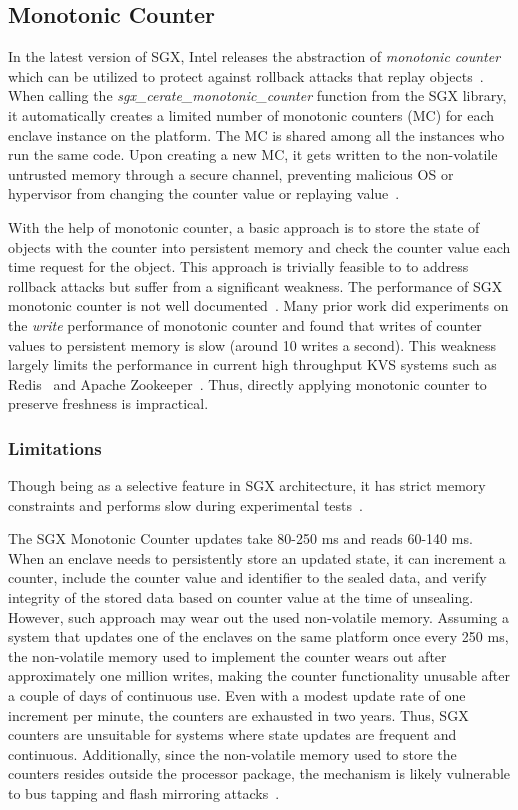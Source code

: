 

\subsection{Monotonic Counter}

In the latest version of SGX, Intel releases the abstraction of \textit{monotonic counter} which can be utilized to 
protect against rollback attacks that replay objects~\cite{}. When calling the 
\textit{sgx\_cerate\_monotonic\_counter} function from the SGX library, it automatically creates a 
limited number of monotonic counters (MC) for each enclave instance on the platform. The MC is shared 
among all the instances who run the same code. Upon creating a new MC, it gets written to the non-volatile
untrusted memory through a secure channel, preventing malicious OS or hypervisor from changing the counter 
value or replaying value~\cite{}.

With the help of monotonic counter, a basic approach is to store
the state of objects with the counter into persistent memory and check the counter value 
each time request for the object. This approach is trivially feasible to to address 
rollback attacks but suffer from a significant weakness. The performance of SGX monotonic 
counter is not well documented~\cite{}. Many prior work did experiments on the \textit{write}
performance of monotonic counter and found that writes of counter values to persistent
memory is slow (around 10 writes a second). This weakness largely limits the performance in 
current high throughput KVS systems such as Redis~\cite{} and Apache Zookeeper~\cite{}.
Thus, directly applying monotonic counter to preserve freshness is impractical.



\subsubsection{Limitations}
Though being as a selective feature in SGX architecture, it has strict memory constraints and performs slow during experimental tests~\cite{}. 

The SGX Monotonic Counter updates take 80-250 ms and reads 60-140 ms. When an enclave needs to persistently store an updated state, it can increment a counter, include the counter value and identifier to the sealed data, and verify integrity of the stored data based on counter value at the time of unsealing. However, such approach may wear out the used non-volatile memory. Assuming a system that updates one of the enclaves on the same platform once every 250 ms, the non-volatile memory used to implement the counter wears out after approximately one million writes, making the counter functionality unusable after a couple of days of continuous use. Even with a modest update rate of one increment per minute, the counters are exhausted in two years. Thus, SGX counters are unsuitable for systems where state updates are frequent and continuous. Additionally, since the non-volatile memory used to store the counters resides outside the processor package, the mechanism is likely vulnerable to bus tapping and flash mirroring attacks~\cite{}.

